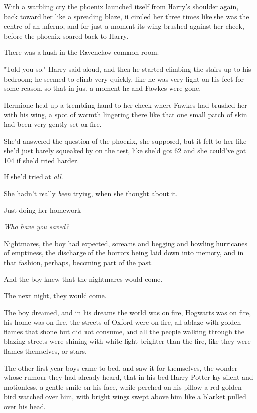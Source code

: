 With a warbling cry the phoenix launched itself from Harry's shoulder again,
back toward her like a spreading blaze, it circled her three times like she was
the centre of an inferno, and for just a moment its wing brushed against her
cheek, before the phoenix soared back to Harry.

There was a hush in the Ravenclaw common room.

"Told you so," Harry said aloud, and then he started climbing the stairs up to
his bedroom; he seemed to climb very quickly, like he was very light on his
feet for some reason, so that in just a moment he and Fawkes were gone.

Hermione held up a trembling hand to her cheek where Fawkes had brushed her
with his wing, a spot of warmth lingering there like that one small patch of
skin had been very gently set on fire.

She'd answered the question of the phoenix, she supposed, but it felt to her
like she'd just barely squeaked by on the test, like she'd got 62 and she
could've got 104 if she'd tried harder.

If she'd tried at \emph{all}.

She hadn't really \emph{been} trying, when she thought about it.

Just doing her homework—

\emph{Who have you saved?}

Nightmares, the boy had expected, screams and begging and howling hurricanes of
emptiness, the discharge of the horrors being laid down into memory, and in
that fashion, perhaps, becoming part of the past.

And the boy knew that the nightmares would come.

The next night, they would come.

The boy dreamed, and in his dreams the world was on fire, Hogwarts was on fire,
his home was on fire, the streets of Oxford were on fire, all ablaze with
golden flames that shone but did not consume, and all the people walking
through the blazing streets were shining with white light brighter than the
fire, like they were flames themselves, or stars.

The other first-year boys came to bed, and saw it for themselves, the wonder
whose rumour they had already heard, that in his bed Harry Potter lay silent and
motionless, a gentle smile on his face, while perched on his pillow a
red-golden bird watched over him, with bright wings swept above him like a
blanket pulled over his head.

